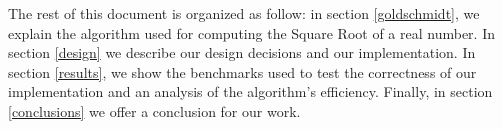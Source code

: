The rest of this document is organized as follow: in section \ref{goldschmidt}, we explain the algorithm used for computing the Square Root of a real number. In section \ref{design} we describe our design decisions and our implementation. In section \ref{results}, we show the benchmarks used to test the correctness of our implementation and an analysis of the algorithm's efficiency. Finally, in section \ref{conclusions} we offer a conclusion for our work.

\clearpage
